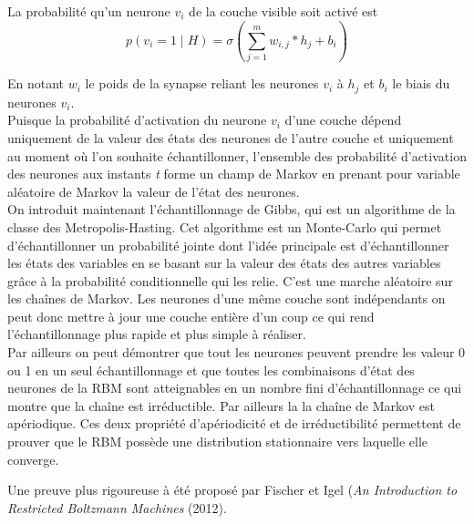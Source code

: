 \documentclass[a4paper,oneside]{report}
\begin{document}
                La probabilité qu'un neurone \begin{math}v_{i}\end{math} de la
                couche visible soit activé est \begin{equation}p( v_{i} =1 \mid H) = 
\sigma(\sum_{j=1}^{m} w_{i,j} * h_{j} + b_{i}) \end{equation}

				En notant \textit{$w_{i}$} le poids de la synapse reliant les neurones \textit{$v_{i}$} 
à \textit{$h_{j}$} et \textit{$b_{i}$} le biais du neurones \textit{$v_{i}$}.\\
        
					Puisque la probabilité  d'activation du neurone \textit{$v_{i}$} d'une couche dépend 
uniquement de la valeur des états des neurones de l'autre couche et uniquement au 
moment où l'on souhaite 
échantillonner, l'ensemble des probabilité d'activation des neurones aux instants \textit{t} forme 
un champ de Markov en prenant pour variable aléatoire de Markov la valeur de l'état des neurones.\\

	     On introduit maintenant l'échantillonnage de Gibbs, qui est un
                algorithme de la classe des Metropolis-Hasting. Cet algorithme
                est un Monte-Carlo qui permet d'échantillonner un probabilité jointe dont l'idée principale
                est d'échantillonner les états des variables en se basant sur la valeur des états
                des autres variables grâce à la probabilité conditionnelle qui les relie. C'est une marche aléatoire sur les chaînes de Markov.
Les neurones d'une même couche sont indépendants on peut donc mettre à jour une couche 
entière d'un coup ce qui rend l'échantillonnage plus rapide et plus simple à réaliser. \\

Par ailleurs on peut démontrer que tout les neurones peuvent prendre les valeur 0 ou 1
 en un seul échantillonnage et que toutes les combinaisons d'état des neurones de la RBM 
sont atteignables en un nombre fini d'échantillonnage ce qui montre que la chaîne est irréductible. Par ailleurs la la chaîne de Markov est apériodique. 
Ces deux propriété d'apériodicité et de irréductibilité permettent de prouver que le RBM
 possède une distribution stationnaire vers laquelle elle converge. 

Une preuve plus rigoureuse à été proposé par Fischer et Igel (\textit{An Introduction to Restricted Boltzmann Machines} (2012).\\
\end{document}
